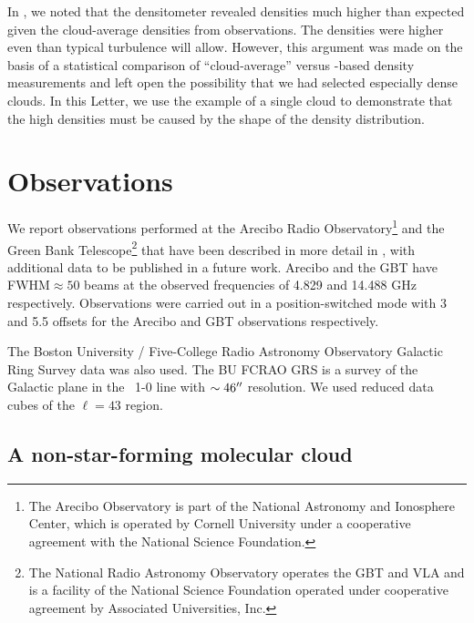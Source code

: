 In \citet{Ginsburg2011a}, we noted that the \formaldehyde densitometer revealed
densities much higher than expected given the cloud-average densities
from \thirteenco observations.  The densities were higher even than typical
turbulence will allow.  However, this argument was made on the basis of a
statistical comparison of ``cloud-average'' versus \formaldehyde-based density
measurements and left open the possibility that we had selected especially dense
clouds.  In this Letter, we use the example of a single cloud to demonstrate
that the high \formaldehyde densities must be caused by the shape
of the density distribution.


\section{Observations}
We report \formaldehyde observations performed at the Arecibo Radio
Observatory\footnote{The Arecibo Observatory is part of the National Astronomy
and Ionosphere Center, which is operated by Cornell University under a
cooperative agreement with the National Science Foundation.  } and the Green
Bank Telescope\footnote{ The National Radio Astronomy Observatory operates the
GBT and VLA and is a facility of the National Science Foundation operated under
cooperative agreement by Associated Universities, Inc.  } that have been 
described in more detail in \citet{Ginsburg2011a}, with additional data to be
published in a future work.  Arecibo and the GBT have FWHM$\approx50$\arcsec
beams at the observed frequencies of 4.829 and 14.488 GHz respectively.
Observations were carried out in a position-switched mode with 3 and 5.5\arcmin
offsets for the Arecibo and GBT observations respectively.

The Boston University / Five-College Radio Astronomy Observatory Galactic Ring
Survey \thirteenco data was also used.  The BU FCRAO GRS \citep{Jackson2006a}
is a survey of the Galactic plane in the \thirteenco\ 1-0 line with $\sim
46\mbox{$^{\prime\prime}$}$ resolution.  We used reduced data cubes of the $\ell=43$ region.

\subsection{A non-star-forming molecular cloud}



